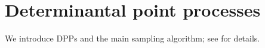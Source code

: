\section{Determinantal point processes} %
\label{sec:determinantal_point_processes}

	We introduce DPPs and the main sampling algorithm; see \citet{HKPV06} for details.

    
    

